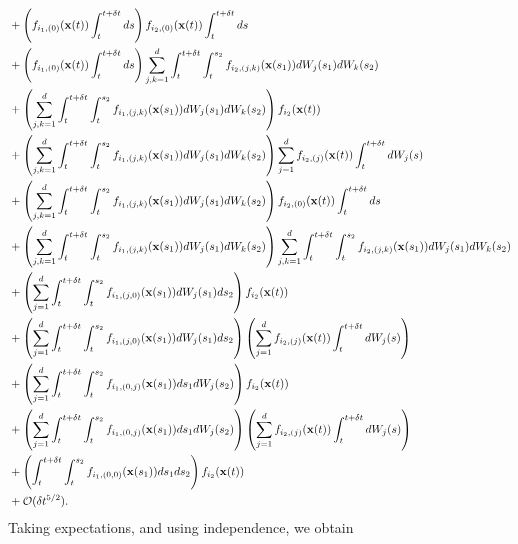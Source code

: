 \begin{equation}
\begin{aligned}
&+  \left( f_{{i_1},(0)}(\mathbf{x}(t)) \int_t^{t + \delta t} ds \right)f_{{i_2},(0)}(\mathbf{x}(t)) \int_t^{t + \delta t} ds \\
& + \left( f_{{i_1},(0)}(\mathbf{x}(t)) \int_t^{t + \delta t} ds \right)\sum_{j, k=1}^d \int_t^{t+\delta t} \int_t^{s_2} f_{{i_2},(j,k)}(\mathbf{x}(s_1)) dW_j(s_1) dW_k(s_2) \\
&+\left( \sum_{j, k=1}^d \int_t^{t+\delta t} \int_t^{s_2} f_{{i_1},(j,k)}(\mathbf{x}(s_1)) dW_j(s_1) dW_k(s_2) \right) f_{i_2}(\mathbf{x}(t)) \\
&+  \left( \sum_{j, k=1}^d \int_t^{t+\delta t} \int_t^{s_2} f_{{i_1},(j,k)}(\mathbf{x}(s_1)) dW_j(s_1) dW_k(s_2) \right) \sum_{j=1}^d f_{{i_2},(j)}(\mathbf{x}(t)) \int_t^{t + \delta t} dW_j(s) \\
&+ \left( \sum_{j, k=1}^d \int_t^{t+\delta t} \int_t^{s_2} f_{{i_1},(j,k)}(\mathbf{x}(s_1)) dW_j(s_1) dW_k(s_2) \right) f_{{i_2},(0)}(\mathbf{x}(t)) \int_t^{t + \delta t} ds \\
&+ \left( \sum_{j, k=1}^d \int_t^{t+\delta t} \int_t^{s_2} f_{{i_1},(j,k)}(\mathbf{x}(s_1)) dW_j(s_1) dW_k(s_2) \right)\sum_{j, k=1}^d \int_t^{t+\delta t} \int_t^{s_2} f_{{i_2},(j,k)}(\mathbf{x}(s_1)) dW_j(s_1) dW_k(s_2) \\
&+ \left( \sum_{j=1}^d \int_t^{t+\delta t} \int_t^{s_2} f_{{i_1},(j,0)}(\mathbf{x}(s_1)) dW_j(s_1) ds_2  \right) f_{i_2}(\mathbf{x}(t)) \\
&+  \left( \sum_{j=1}^d \int_t^{t+\delta t} \int_t^{s_2} f_{{i_1},(j,0)}(\mathbf{x}(s_1)) dW_j(s_1) ds_2  \right)\left( \sum_{j=1}^d f_{{i_2},(j)}(\mathbf{x}(t)) \int_t^{t + \delta t} dW_j(s) \right)\\
&+ \left( \sum_{j=1}^d \int_t^{t+\delta t} \int_t^{s_2} f_{{i_1},(0,j)}(\mathbf{x}(s_1)) ds_1 dW_j(s_2)  \right) f_{i_2}(\mathbf{x}(t)) \\
&+  \left( \sum_{j=1}^d \int_t^{t+\delta t} \int_t^{s_2} f_{{i_1},(0,j)}(\mathbf{x}(s_1)) ds_1 dW_j(s_2)  \right)\left( \sum_{j=1}^d f_{{i_2},(j)}(\mathbf{x}(t)) \int_t^{t + \delta t} dW_j(s) \right) \\
&+ \left( \int_t^{t+\delta t} \int_t^{s_2} f_{{i_1},(0,0)}(\mathbf{x}(s_1)) ds_1 ds_2 \right) f_{i_2}(\mathbf{x}(t)) \\
&+ \mathcal{O} (\delta t^{5/2}) .
\end{aligned}
\end{equation}
%
Taking expectations, and using independence, we obtain
%
